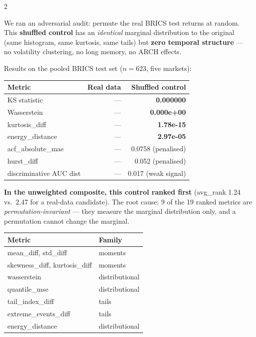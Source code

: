 \documentclass[10pt]{article}
\newcommand{\skybox}[2]{\begin{tcolorbox}[mybox={Sky}{BBg},title={#1}]#2\end{tcolorbox}}
\newcommand{\redbox}[2]{\begin{tcolorbox}[mybox={DRed}{RBg},title={#1}]#2\end{tcolorbox}}
\begin{document}
\begin{multicols}{2}

\redbox{The Adversarial Baseline That Wins Without Learning}{%
We ran an adversarial audit: permute the real BRICS test returns at random. This \textbf{shuffled control} has an \emph{identical} marginal distribution to the original (same histogram, same kurtosis, same tails) but \textbf{zero temporal structure} --- no volatility clustering, no long memory, no ARCH effects.

\smallskip
Results on the pooled BRICS test set ($n = 623$, five markets):

\smallskip
\begin{tabular}{@{}lrr@{}}
\toprule
Metric & Real data & Shuffled control \\
\midrule
KS statistic       & --- & \textbf{0.000000} \\
Wasserstein        & --- & \textbf{0.000e+00} \\
kurtosis\_diff     & --- & \textbf{1.78e-15} \\
energy\_distance   & --- & \textbf{2.97e-05} \\
acf\_absolute\_mae & --- & 0.0758 (penalised) \\
hurst\_diff        & --- & 0.052 (penalised) \\
discriminative AUC dist & --- & 0.017 (weak signal) \\
\bottomrule
\end{tabular}

\smallskip
\textbf{In the unweighted composite, this control ranked first} (avg\_rank 1.24 vs.\ 2.47 for a real-data candidate). The root cause: 9 of the 19 ranked metrics are \emph{permutation-invariant} --- they measure the marginal distribution only, and a permutation cannot change the marginal.}

\skybox{The Nine Permutation-Invariant Metrics}{%
\begin{tabular}{@{}ll@{}}
\toprule
Metric & Family \\
\midrule
mean\_diff, std\_diff     & moments \\
skewness\_diff, kurtosis\_diff & moments \\
wasserstein              & distributional \\
quantile\_mse            & distributional \\
tail\_index\_diff        & tails \\
extreme\_events\_diff    & tails \\
energy\_distance         & distributional \\
\bottomrule
\end{tabular}

}
\end{multicols}
\end{document}
